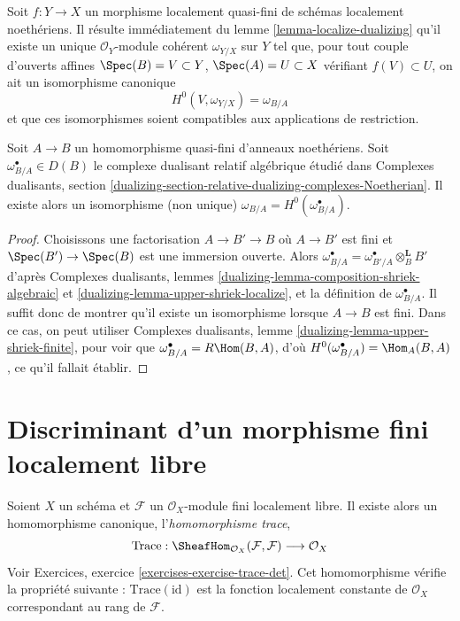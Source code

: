 \begin{remark}
\label{remark-relative-dualizing-for-quasi-finite}
Soit $f : Y \to X$ un morphisme localement quasi-fini de schémas localement
noethériens. Il résulte immédiatement du lemme \ref{lemma-localize-dualizing}
qu'il existe un unique $\mathcal{O}_Y$-module cohérent
$\omega_{Y/X}$ sur $Y$ tel que, pour tout couple d'ouverts affines
$\Spec(B) = V \subset Y$, $\Spec(A) = U \subset X$ vérifiant $f(V) \subset U$,
on ait un isomorphisme canonique
$$
H^0(V, \omega_{Y/X}) = \omega_{B/A}
$$
et que ces isomorphismes soient compatibles aux applications de restriction.
\end{remark}

\begin{lemma}
\label{lemma-compare-dualizing-algebraic}
Soit $A \to B$ un homomorphisme quasi-fini d'anneaux noethériens.
Soit $\omega_{B/A}^\bullet \in D(B)$ le complexe dualisant relatif
algébrique étudié dans Complexes dualisants, section
\ref{dualizing-section-relative-dualizing-complexes-Noetherian}.
Il existe alors un isomorphisme (non unique)
$\omega_{B/A} = H^0(\omega_{B/A}^\bullet)$.
\end{lemma}

\begin{proof}
Choisissons une factorisation $A \to B' \to B$
où $A \to B'$ est fini et $\Spec(B') \to \Spec(B)$
est une immersion ouverte. Alors
$\omega_{B/A}^\bullet = \omega_{B'/A}^\bullet \otimes_B^\mathbf{L} B'$
d'après Complexes dualisants, lemmes
\ref{dualizing-lemma-composition-shriek-algebraic} et
\ref{dualizing-lemma-upper-shriek-localize}, et
la définition de $\omega_{B/A}^\bullet$. Il suffit donc
de montrer qu'il existe un isomorphisme lorsque $A \to B$ est fini.
Dans ce cas, on peut utiliser
Complexes dualisants, lemme \ref{dualizing-lemma-upper-shriek-finite},
pour voir que $\omega_{B/A}^\bullet = R\Hom(B, A)$, d'où
$H^0(\omega^\bullet_{B/A}) = \Hom_A(B, A)$, ce qu'il fallait établir.
\end{proof}






\section{Discriminant d'un morphisme fini localement libre}
\label{section-discriminant}

\noindent
Soient $X$ un schéma et $\mathcal{F}$ un $\mathcal{O}_X$-module fini localement
libre. Il existe alors un homomorphisme canonique, l'{\it homomorphisme trace},
$$
\text{Trace} :
\SheafHom_{\mathcal{O}_X}(\mathcal{F}, \mathcal{F})
\longrightarrow
\mathcal{O}_X
$$
Voir Exercices, exercice \ref{exercises-exercise-trace-det}. Cet homomorphisme vérifie
la propriété suivante : $\text{Trace}(\text{id})$ est la fonction localement constante
de $\mathcal{O}_X$ correspondant au rang de $\mathcal{F}$.

